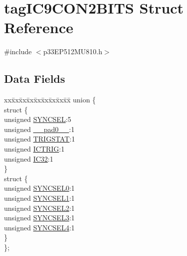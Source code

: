 \hypertarget{structtag_i_c9_c_o_n2_b_i_t_s}{}\section{tag\+I\+C9\+C\+O\+N2\+B\+I\+TS Struct Reference}
\label{structtag_i_c9_c_o_n2_b_i_t_s}


{\ttfamily \#include $<$p33\+E\+P512\+M\+U810.\+h$>$}

\subsection*{Data Fields}
\begin{DoxyCompactItemize}
\item 
\begin{tabbing}
xx\=xx\=xx\=xx\=xx\=xx\=xx\=xx\=xx\=\kill
union \{\\
\>struct \{\\
\>\>unsigned \hyperlink{structtag_i_c9_c_o_n2_b_i_t_s_a35fbbe11485c2615ed27535b62c3fa35}{SYNCSEL}:5\\
\>\>unsigned \hyperlink{structtag_i_c9_c_o_n2_b_i_t_s_adf71f3d8410c1f1dbbc96680a92c49af}{\_\_pad0\_\_}:1\\
\>\>unsigned \hyperlink{structtag_i_c9_c_o_n2_b_i_t_s_ab379549de54ac93ad4aa73686c34cb7c}{TRIGSTAT}:1\\
\>\>unsigned \hyperlink{structtag_i_c9_c_o_n2_b_i_t_s_a79bd14cfd2e403f3a96ce0b3bb58097b}{ICTRIG}:1\\
\>\>unsigned \hyperlink{structtag_i_c9_c_o_n2_b_i_t_s_afc705120246cb4ca0c93c87817519b7f}{IC32}:1\\
\>\} \\
\>struct \{\\
\>\>unsigned \hyperlink{structtag_i_c9_c_o_n2_b_i_t_s_a3b5df3154fde5141e6ac0156425ff8b4}{SYNCSEL0}:1\\
\>\>unsigned \hyperlink{structtag_i_c9_c_o_n2_b_i_t_s_a50e73f95ab1c258ddc64f69c0991deaf}{SYNCSEL1}:1\\
\>\>unsigned \hyperlink{structtag_i_c9_c_o_n2_b_i_t_s_a304907a5d2c4cbf1114a54642a85951e}{SYNCSEL2}:1\\
\>\>unsigned \hyperlink{structtag_i_c9_c_o_n2_b_i_t_s_a6bbd1bd2ead6c9fa713969c6eb0f0c75}{SYNCSEL3}:1\\
\>\>unsigned \hyperlink{structtag_i_c9_c_o_n2_b_i_t_s_a0cd5bbe196c7974953909d27a6307bb7}{SYNCSEL4}:1\\
\>\} \\
\}; \\

\end{tabbing}\end{DoxyCompactItemize}


